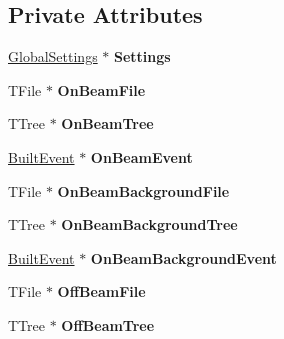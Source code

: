 \subsection*{Private Attributes}
\begin{DoxyCompactItemize}
\item 
\hypertarget{class_event_builder_a94aab3d55a56f438197db6bc09cb4c93}{\hyperlink{class_global_settings}{Global\-Settings} $\ast$ {\bfseries Settings}}\label{class_event_builder_a94aab3d55a56f438197db6bc09cb4c93}

\item 
\hypertarget{class_event_builder_a5efb112986e5be473fad2377d162f901}{T\-File $\ast$ {\bfseries On\-Beam\-File}}\label{class_event_builder_a5efb112986e5be473fad2377d162f901}

\item 
\hypertarget{class_event_builder_a55598b7592ab2e97ccbab1d5bc9bd3ba}{T\-Tree $\ast$ {\bfseries On\-Beam\-Tree}}\label{class_event_builder_a55598b7592ab2e97ccbab1d5bc9bd3ba}

\item 
\hypertarget{class_event_builder_a06ecb6ed57fe764a43f30c737fa304ee}{\hyperlink{class_built_event}{Built\-Event} $\ast$ {\bfseries On\-Beam\-Event}}\label{class_event_builder_a06ecb6ed57fe764a43f30c737fa304ee}

\item 
\hypertarget{class_event_builder_a5bb1252e99bae09707fd20de51ffd703}{T\-File $\ast$ {\bfseries On\-Beam\-Background\-File}}\label{class_event_builder_a5bb1252e99bae09707fd20de51ffd703}

\item 
\hypertarget{class_event_builder_a6c710645c7dd1e3b85fa0c5c7bb3a2ff}{T\-Tree $\ast$ {\bfseries On\-Beam\-Background\-Tree}}\label{class_event_builder_a6c710645c7dd1e3b85fa0c5c7bb3a2ff}

\item 
\hypertarget{class_event_builder_ad3a26cd323f583d45fb572929c8e14ad}{\hyperlink{class_built_event}{Built\-Event} $\ast$ {\bfseries On\-Beam\-Background\-Event}}\label{class_event_builder_ad3a26cd323f583d45fb572929c8e14ad}

\item 
\hypertarget{class_event_builder_ae3c184017092b759b7af047a8bc3c76c}{T\-File $\ast$ {\bfseries Off\-Beam\-File}}\label{class_event_builder_ae3c184017092b759b7af047a8bc3c76c}

\item 
\hypertarget{class_event_builder_ad39ee1e9984468f865d2339fcec51fae}{T\-Tree $\ast$ {\bfseries Off\-Beam\-Tree}}\label{class_event_builder_ad39ee1e9984468f865d2339fcec51fae}


\end{DoxyCompactItemize}
